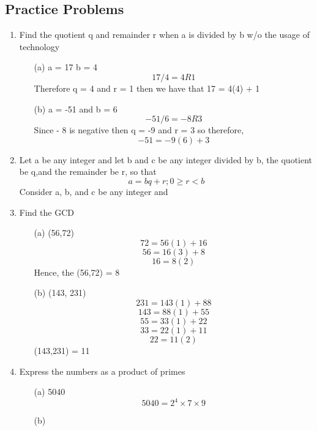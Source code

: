 \documentclass[12pt]{article}
\begin{document}
\subsection*{Practice Problems}
\begin{enumerate}
    \item Find the quotient q and remainder r when a is divided by b w/o the usage of technology
    \begin{itemize}
        \item[(a)] a = 17 b = 4
        \begin{equation*}
            17/4 = 4 R 1 
        \end{equation*}
        Therefore q = 4 and r = 1 then we have that 17 = 4(4) + 1 
        \item[(b)] a = -51 and b = 6 
        \begin{equation*}
            -51/6 = - 8 R 3 
        \end{equation*}
        Since - 8 is negative then q = -9 and r = 3 so therefore, 
        \begin{equation*}
            -51 = -9(6) + 3 
        \end{equation*}
    \end{itemize}
    \item Let a be any integer and let b and c be any integer divided by b, the quotient be q,and the remainder be r, so that 
    \begin{equation*}
        a = bq + r;  0 \geq r < b
    \end{equation*}
    Consider a, b, and c be any integer and 
    \item Find the GCD 
    \begin{itemize}
        \item[(a)] (56,72) 
        $$ 72 = 56(1) + 16$$
        $$ 56 = 16(3) + 8 $$
        $$ 16 = 8(2) $$
        Hence, the (56,72) = 8 
        \item[(b)] (143, 231) 
        $$ 231 = 143(1) + 88 $$
        $$ 143 = 88(1) + 55 $$
        $$ 55 = 33(1) + 22 $$
        $$ 33 = 22(1) + 11 $$
        $$ 22 = 11(2) $$
        (143,231) = 11
    \end{itemize}
   \item Express the numbers as a product of primes 
   \begin{itemize}
       \item[(a)] 5040 \newline 
       $$ 5040 = 2^4 \times 7 \times 9 $$
       \item[(b)] 

\end{itemize}
\end{enumerate}
\end{document}
